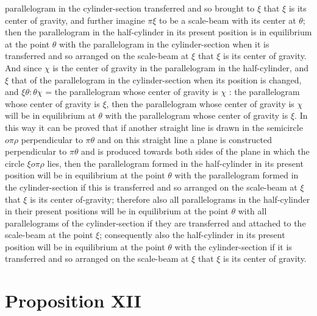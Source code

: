\documentclass[12pt]{article}
\begin{document}
parallelogram in the cylinder-section transferred and so brought to
$\xi$ that $\xi$ is its center of gravity, and further imagine
$\pi\xi$ to be a scale-beam with its center at $\theta$; then the
parallelogram in the half-cylinder in its present position is in
equilibrium at the point $\theta$ with the parallelogram in the
cylinder-section when it is transferred and so arranged on the
scale-beam at $\xi$ that $\xi$ is its center of gravity. And since
$\chi$ is the center of gravity in the parallelogram in the
half-cylinder, and $\xi$ that of the parallelogram in the
cylinder-section when its position is changed, and $\xi\theta :
\theta\chi$ = the parallelogram whose center of gravity is $\chi$ :
the parallelogram whose center of gravity is $\xi$, then the
parallelogram whose center of gravity is $\chi$ will be in equilibrium
at $\theta$ with the parallelogram whose center of gravity is
$\xi$. In this way it can be proved that if another straight line is
drawn in the semicircle $o\pi\rho$ perpendicular to $\pi\theta$ and on
this straight line a plane is constructed perpendicular to $\pi\theta$
and is produced towards both sides of the plane in which the circle
$\xi o\pi\rho$ lies, then the parallelogram formed in the
half-cylinder in its present position will be in equilibrium at the
point $\theta$ with the parallelogram formed in the cylinder-section
if this is transferred and so arranged on the scale-beam at $\xi$ that
$\xi$ is its center of-gravity; therefore also all parallelograms in
the half-cylinder in their present positions will be in equilibrium at
the point $\theta$ with all parallelograms of the cylinder-section if
they are transferred and attached to the scale-beam at the point
$\xi$; consequently also the half-cylinder in its present position
will be in equilibrium at the point $\theta$ with the cylinder-section
if it is transferred and so arranged on the scale-beam at $\xi$ that
$\xi$ is its center of gravity.


\section*{Proposition XII}
\end{document}
